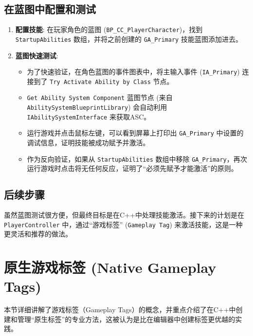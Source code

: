 \documentclass[math,code,10pt,CJKmath]{amznotes}
\begin{document}
\subsection{在蓝图中配置和测试}
\begin{enumerate}
    \item \textbf{配置技能}: 在玩家角色的蓝图 (\texttt{BP\_CC\_PlayerCharacter})，找到 \texttt{StartupAbilities} 数组，并将之前创建的 \texttt{GA\_Primary} 技能蓝图添加进去。
    \item \textbf{蓝图快速测试}:
    \begin{itemize}
        \item 为了快速验证，在角色蓝图的事件图表中，将主输入事件 (\texttt{IA\_Primary}) 连接到了 \texttt{Try Activate Ability by Class} 节点。
        \item \texttt{Get Ability System Component} 蓝图节点 (来自 \texttt{AbilitySystemBlueprintLibrary}) 会自动利用 \texttt{IAbilitySystemInterface} 来获取ASC。
        \item 运行游戏并点击鼠标左键，可以看到屏幕上打印出 \texttt{GA\_Primary} 中设置的调试信息，证明技能被成功赋予并激活。
        \item 作为反向验证，如果从 \texttt{StartupAbilities} 数组中移除 \texttt{GA\_Primary}，再次运行游戏时点击将无任何反应，证明了“必须先赋予才能激活”的原则。
    \end{itemize}
\end{enumerate}

\subsection{后续步骤}
虽然蓝图测试很方便，但最终目标是在C++中处理技能激活。接下来的计划是在\texttt{PlayerController} 中，通过“游戏标签” (\texttt{Gameplay Tag}) 来激活技能，这是一种更灵活和推荐的做法。


\section{原生游戏标签 (Native Gameplay Tags)}
本节详细讲解了游戏标签（Gameplay Tags）的概念，并重点介绍了在C++中创建和管理“原生标签”的专业方法，这被认为是比在编辑器中创建标签更优越的实践。
\end{document}
